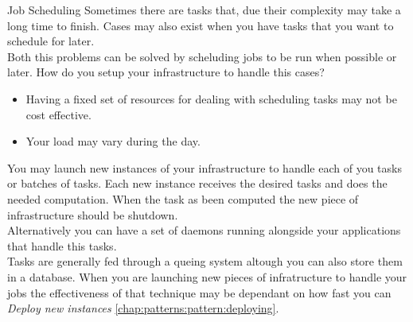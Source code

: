 \begin{pattern}{Job Scheduling}
    \context
        Sometimes there are tasks that, due their complexity may take a long time to finish. Cases may also exist when you have tasks that you want to schedule for later. \\
        Both this problems can be solved by scheluding jobs to be run when possible or later.
    \problem
        How do you setup your infrastructure to handle this cases?
    \forces
        \begin{itemize}
            \item Having a fixed set of resources for dealing with scheduling tasks may not be cost effective.
            \item Your load may vary during the day.
        \end{itemize}
    \solution
        You may launch new instances of your infrastructure to handle each of you tasks or batches of tasks. Each new instance receives the desired tasks and does the needed computation. When the task as been computed the new piece of infrastructure should be shutdown.\\
        Alternatively you can have a set of daemons running alongside your applications that handle this tasks.\\
        Tasks are generally fed through a queing system altough you can also store them in a database.
    \related
    When you are launching new pieces of infratructure to handle your jobs the effectiveness of that technique may be dependant on how fast you can \textit{Deploy new instances} \ref{chap:patterns:pattern:deploying}.
\end{pattern}



